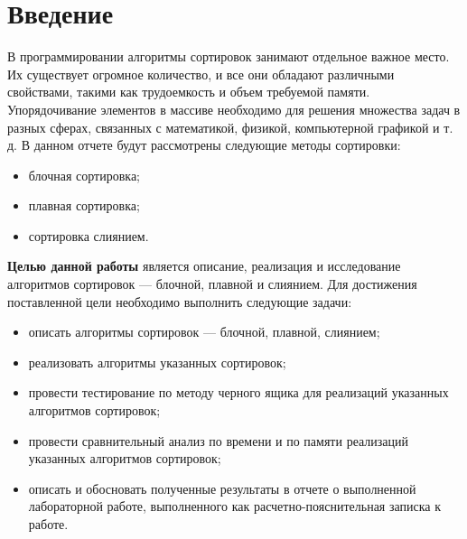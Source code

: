 \chapter*{Введение}

В программировании алгоритмы сортировок занимают отдельное важное
место. Их существует огромное количество, и все они обладают различными
свойствами, такими как трудоемкость и объем требуемой памяти.
Упорядочивание элементов в массиве необходимо для решения множества
задач в разных сферах, связанных с математикой, физикой, компьютерной
графикой и т. д.
В данном отчете будут рассмотрены следующие методы сортировки:

\begin{itemize}[label=---]
	\item блочная сортировка;
	\item плавная сортировка;
	\item сортировка слиянием.
\end{itemize}

\textbf{Целью данной работы} является описание, реализация и исследование алгоритмов сортировок --- блочной, плавной и слиянием. Для достижения поставленной цели необходимо выполнить следующие задачи:

\begin{itemize}[label=---]
	\item описать алгоритмы сортировок --- блочной, плавной, слиянием;
	
	\item реализовать алгоритмы указанных сортировок;
	
	\item провести тестирование по методу черного ящика для реализаций указанных алгоритмов сортировок;
	
	\item провести сравнительный анализ по времени и по памяти реализаций указанных алгоритмов сортировок;
	
	\item описать и обосновать полученные результаты в отчете о выполненной лабораторной работе, выполненного как расчетно-пояснительная записка к работе.
\end{itemize}